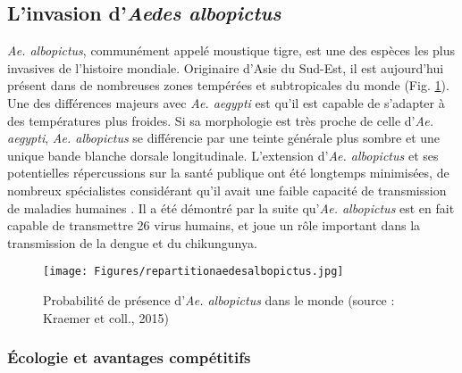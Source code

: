 \subsection{L'invasion d'{\em Aedes albopictus} }


{\em Ae. albopictus}, communément appelé \guillemotleft moustique tigre\guillemotright \;, est une des espèces les plus invasives de l'histoire mondiale. 
Originaire d'Asie du Sud-Est, il est aujourd'hui présent dans de nombreuses zones tempérées et subtropicales du monde (Fig. \ref{fig:repartitionaedesalbopictus}). 
Une des différences majeurs avec {\em Ae. aegypti} est qu'il est capable de s'adapter à des températures plus froides.
Si sa morphologie est très proche de celle d'{\em Ae. aegypti}, {\em Ae. albopictus} se différencie par une teinte générale plus sombre et une unique bande blanche dorsale longitudinale.
L'extension d'{\em Ae. albopictus} et ses potentielles répercussions sur la santé publique ont été longtemps minimisées, de nombreux spécialistes considérant qu'il avait une faible capacité de transmission de maladies humaines \cite{paupy2009aedes}. 
Il a été démontré par la suite qu'{\em Ae. albopictus} est en fait capable de transmettre 26 virus humains, et joue un rôle important dans la transmission de la dengue et du chikungunya.


\begin{figure}[t]
	\centering
	\texttt{[image: Figures/repartitionaedesalbopictus.jpg]}
	\caption{Probabilité de présence d'{\em Ae. albopictus} dans le monde (source : Kraemer et coll., 2015)}
	\label{fig:repartitionaedesalbopictus}
\end{figure}


\subsubsection{Écologie et avantages compétitifs}

